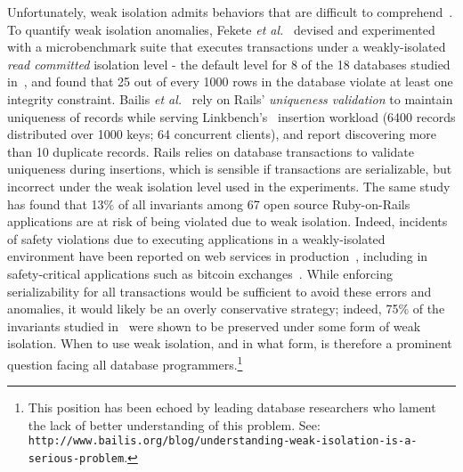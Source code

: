 Unfortunately, weak isolation admits behaviors that are difficult to
comprehend~\cite{berenson}. To quantify weak isolation anomalies,
Fekete \emph{et al.}~\cite{feketevldb09} devised and experimented with
a microbenchmark suite that executes transactions under a
weakly-isolated \emph{read committed} isolation level - the default
level for 8 of the 18 databases studied in~\cite{bailishotos}, and
found that 25 out of every 1000 rows in the database violate at least
one integrity constraint. Bailis \emph{et al.}~\cite{bailisferal} rely
on Rails' \emph{uniqueness validation} to maintain uniqueness of
records while serving Linkbench's~\cite{linkbench} insertion workload
(6400 records distributed over 1000 keys; 64 concurrent clients), and
report discovering more than 10 duplicate records.  Rails relies on
database transactions to validate uniqueness during insertions, which
is sensible if transactions are serializable, but incorrect under the
weak isolation level used in the experiments. The same study has found
that 13\% of all invariants among 67 open source Ruby-on-Rails
applications are at risk of being violated due to weak
isolation. Indeed, incidents of safety violations due to executing
applications in a weakly-isolated environment have been reported on
web services in production~\cite{starbucksbug, scimedbug}, including
in safety-critical applications such as bitcoin
exchanges~\cite{poloniexbug, bitcoinbug}. While enforcing
serializability for all transactions would be sufficient to avoid
these errors and anomalies, it would likely be an overly conservative
strategy; indeed, 75\% of the invariants studied in~\cite{bailisferal}
were shown to be preserved under some form of weak isolation.  When to
use weak isolation, and in what form, is therefore a prominent
question facing all database programmers.\footnote{This position has
  been echoed by leading database researchers who lament the lack of
  better understanding of this problem.  See: {\tt
    http://www.bailis.org/blog/understanding-weak-isolation-is-a-serious-problem}.}

